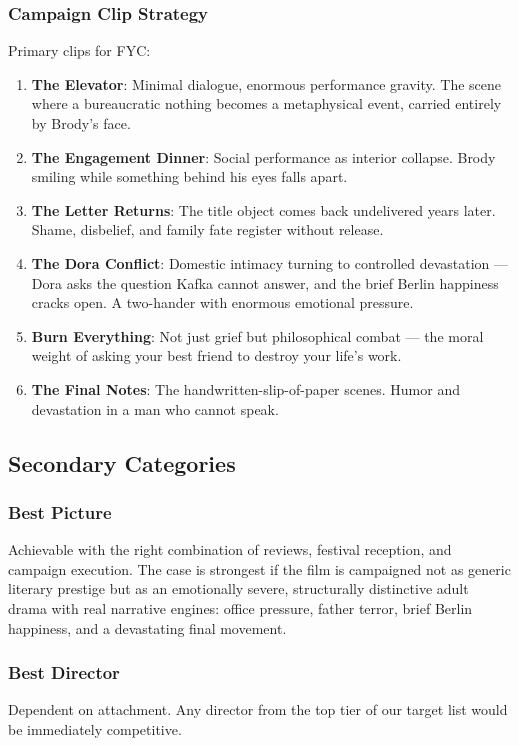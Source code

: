 \subsubsection{Campaign Clip Strategy}
Primary clips for FYC:
\begin{enumerate}[leftmargin=*]
\item \textbf{The Elevator}: Minimal dialogue, enormous performance gravity. The scene where a bureaucratic nothing becomes a metaphysical event, carried entirely by Brody's face.
\item \textbf{The Engagement Dinner}: Social performance as interior collapse. Brody smiling while something behind his eyes falls apart.
\item \textbf{The Letter Returns}: The title object comes back undelivered years later. Shame, disbelief, and family fate register without release.
\item \textbf{The Dora Conflict}: Domestic intimacy turning to controlled devastation --- Dora asks the question Kafka cannot answer, and the brief Berlin happiness cracks open. A two-hander with enormous emotional pressure.
\item \textbf{Burn Everything}: Not just grief but philosophical combat --- the moral weight of asking your best friend to destroy your life's work.
\item \textbf{The Final Notes}: The handwritten-slip-of-paper scenes. Humor and devastation in a man who cannot speak.
\end{enumerate}

\subsection{Secondary Categories}

\subsubsection{Best Picture}
Achievable with the right combination of reviews, festival reception, and campaign execution. The case is strongest if the film is campaigned not as generic literary prestige but as an emotionally severe, structurally distinctive adult drama with real narrative engines: office pressure, father terror, brief Berlin happiness, and a devastating final movement.

\subsubsection{Best Director}
Dependent on attachment. Any director from the top tier of our target list would be immediately competitive.

